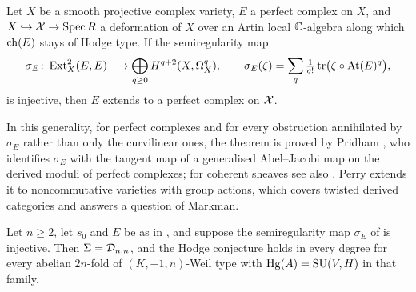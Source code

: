 \begin{theorem}\label{thm:BF}
Let $X$ be a smooth projective complex variety, $E$ a perfect complex on $X$,
and $X\hookrightarrow\mathcal{X}\to\operatorname{Spec} R$ a deformation of $X$ over an Artin local
$\mathbb{C}$-algebra along which $\operatorname{ch}(E)$ stays of Hodge type. If the semiregularity
map
\[
  \sigma_{E}\colon\operatorname{Ext}^{2}_{X}(E,E)
  \longrightarrow\bigoplus_{q\ge0}H^{q+2}(X,\Omega^{q}_{X}),
  \qquad
  \sigma_{E}(\zeta)=\sum_{q}\tfrac{1}{q!}\,
    \mathrm{tr}\bigl(\zeta\circ\mathrm{At}(E)^{q}\bigr),
\]
is injective, then $E$ extends to a perfect complex on $\mathcal{X}$.
\end{theorem}

In this generality, for perfect complexes and for every obstruction
annihilated by $\sigma_{E}$ rather than only the curvilinear ones, the
theorem is proved by Pridham \cite{Pri24}, who identifies $\sigma_{E}$ with the
tangent map of a generalised Abel--Jacobi map on the derived moduli of perfect
complexes; for coherent sheaves see also \cite{BLM23}. Perry \cite{Per26}
extends it to noncommutative varieties with group actions, which covers
twisted derived categories and answers a question of Markman.

\begin{theorem}
\label{thm:semiregclosure}
Let $n\ge2$, let $s_{0}$ and $E$ be as in , and suppose the
semiregularity map $\sigma_{E}$ of  is injective. Then
$\Sigma=\mathcal{D}_{n,n}$, and the Hodge conjecture holds in every degree for every
abelian $2n$-fold of $(K,-1,n)$-Weil type with $\operatorname{Hg}(A)=\operatorname{SU}(V,H)$ in that
family.
\end{theorem}

